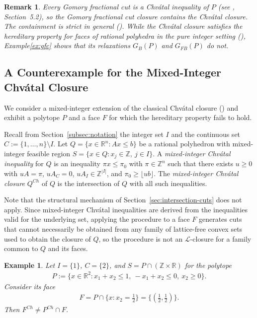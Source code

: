 \documentclass{article}
\newtheorem{example}{Example}
\newtheorem{remark}{Remark}
\newcommand{\Z}{\mathbb{Z}}
\newcommand{\R}{\mathbb{R}}
\renewcommand{\L}{\mathcal{L}}
\newcommand{\floor}[1]{\lfloor #1 \rfloor}
\begin{document}
\begin{remark} \label{rmk:gfc-chvatal}
    Every Gomory fractional cut is a Chv\'atal inequality of $P$ (see \cite{conforti2014integer}, Section~5.2), so the Gomory fractional cut closure contains the Chv\'atal closure. The containment is strict in general (\cite{cornuejols2001elementary}). While the Chv\'atal closure satisfies the hereditary property for faces of rational polyhedra in the pure integer setting (\cite{schrijver1980cutting}), Example\ref{ex:gfc} shows that its relaxations $G_B(P)$ and $G_{FB}(P)$ do not.
\end{remark}

\subsection{A Counterexample for the Mixed-Integer Chv\'atal Closure} \label{subsec:counter-mixed-chvatal}

We consider a mixed-integer extension of the classical Chv\'atal closure (\cite{chvatal1973edmonds}) and exhibit a polytope $P$ and a face $F$ for which the hereditary property fails to hold.

Recall from Section~\ref{subsec:notation} the integer set $I$ and the continuous set $C := \{1,\ldots,n\} \setminus I$. Let $Q = \{x \in \R^n : Ax \leq b\}$ be a rational polyhedron with mixed-integer feasible region $S = \{x \in Q : x_j \in \Z, \ j \in I\}$. A \emph{mixed-integer Chv\'atal inequality} for $Q$ is an inequality $\pi x \leq \pi_0$ with $\pi \in \Z^n$ such that there exists $u \geq 0$ with $uA = \pi$, $uA_C = 0$, $uA_I \in \Z^{|I|}$, and $\pi_0 \geq \floor{ub}$. The \emph{mixed-integer Chv\'atal closure} $Q^{Ch}$ of $Q$ is the intersection of $Q$ with all such inequalities. 

Note that the structural mechanism of Section~\ref{sec:intersection-cuts} does not apply. Since mixed-integer Chv\'atal inequalities are derived from the inequalities valid for the underlying set, applying the procedure to a face $F$ generates cuts that cannot necessarily be obtained from any family of lattice-free convex sets used to obtain the closure of $Q$, so the procedure is not an $\L$-closure for a family common to $Q$ and its faces.

\begin{example}
    Let $I = \{1\}$, $C = \{2\}$, and $S = P \cap (\Z \times \R)$ for the polytope
    \begin{align}
        P := \{x \in \R^2: x_1 + x_2 \leq 1, \ -x_1 + x_2 \leq 0, \ x_2 \geq 0\}.
    \end{align}
    Consider its face
    \begin{align}
        F = P \cap \{x : x_2 = \tfrac{1}{2}\} = \{(\tfrac{1}{2},\tfrac{1}{2})\}.
    \end{align}
    Then $F^{Ch} \neq P^{Ch} \cap F$.
\end{example}
\end{document}
